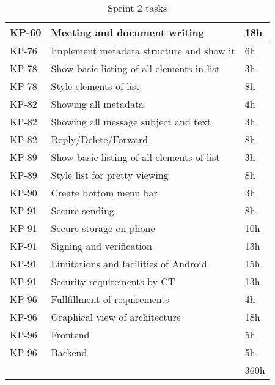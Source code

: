\begin{table}[hbt]
\begin{tabularx}{\linewidth}{>{\setlength\hsize{.2\hsize}}X|>{\setlength\hsize{1.5\hsize}}X|>{\setlength\hsize{.1\hsize}}X}
KP-60 & Meeting and document writing & 18h \\ \hline
KP-76 & Implement metadata structure and show it & 6h \\ \hline
KP-78 & Show basic listing of all elements in list & 3h \\ \hline
KP-78 & Style elements of list & 8h \\ \hline
KP-82 & Showing all metadata & 4h \\ \hline
KP-82 & Showing all message subject and text & 3h \\ \hline
KP-82 & Reply/Delete/Forward & 8h \\ \hline
KP-89 & Show basic listing of all elements of list & 3h \\ \hline
KP-89 & Style list for pretty viewing & 8h \\ \hline
KP-90 & Create bottom menu bar & 3h \\ \hline
KP-91 & Secure sending & 8h \\ \hline
KP-91 & Secure storage on phone & 10h \\ \hline
KP-91 & Signing and verification & 13h \\ \hline
KP-91 & Limitations and facilities of Android & 15h \\ \hline
KP-91 & Security requirements by CT & 13h \\ \hline
KP-96 & Fullfillment of requirements & 4h \\ \hline
KP-96 & Graphical view of architecture & 18h \\ \hline
KP-96 & Frontend & 5h \\ \hline
KP-96 & Backend & 5h \\ \hline
 &  & 360h \\ \hline
\end{tabularx}
\caption{Sprint 2 tasks} \label{tab:sprint2tasks}
\end{table}